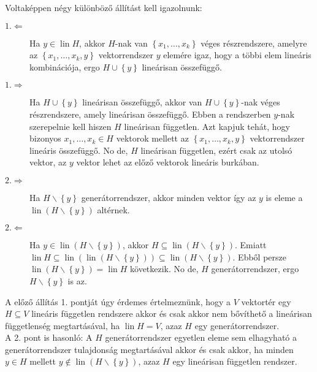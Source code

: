 \documentclass[9pt, a4paper, showtrims]{memoir}
\makeatletter
\renewenvironment{proof}[1][\proofname]
    {\par\pushQED{\qed}%
    \normalfont \topsep6\p@\@plus6\p@\relax
    \trivlist
    \item[\hskip\labelsep
        \itshape
    #1\@addpunct{:}]\ignorespaces}
    {\popQED\endtrivlist\@endpefalse}
\theoremstyle{plain}
\theoremstyle{remark}
\theoremstyle{definition}
\DeclareMathOperator{\lin}{lin}
\makeatother
\begin{document}
\begin{proof}
    Voltaképpen négy különböző állítást kell igazolnunk:
    \begin{description}
        \item[$1.\Leftarrow$]
            Ha $y\in\lin H$, akkor $H$-nak van $\left\{ x_1,\ldots,x_k \right\}$ véges részrendszere,
            amelyre az $\left\{ x_1,\ldots,x_k,y \right\}$ vektorrendszer $y$ elemére igaz, hogy a többi elem lineáris kombinációja,
            ergo $H\cup\left\{ y \right\}$ lineárisan összefüggő.
        \item[$1.\Rightarrow$]
            Ha $H\cup\left\{ y \right\}$ lineárisan összefüggő, akkor van $H\cup\left\{ y \right\}$-nak véges részrendszere, amely lineárisan összefüggő.
            Ebben a rendszerben $y$-nak szerepelnie kell hiszen $H$ lineárisan független.
            Azt kapjuk tehát, hogy bizonyos $x_1,\ldots,x_k\in H$ vektorok mellett az $\left\{ x_1,\ldots,x_k,y \right\}$ vektorrendszer lineáris összefüggő.
            No de, $H$ lineárisan független, ezért csak az utolsó vektor, az $y$ vektor lehet az előző vektorok lineáris burkában.
        \item[$2.\Rightarrow$]
            Ha $H\smallsetminus\left\{ y \right\}$ generátorrendszer, akkor minden vektor így az $y$ is eleme a $\lin\left( H\smallsetminus\left\{ y \right\} \right)$ altérnek.
        \item[$2.\Leftarrow$]
            Ha $y\in\lin\left( H\smallsetminus\left\{ y \right\} \right)$, akkor $H\subseteq\lin\left( H\smallsetminus\left\{ y \right\} \right)$.
            Emiatt $\lin H\subseteq\lin\left( \lin\left( H\smallsetminus\left\{ y \right\} \right) \right)\subseteq\lin\left( H\smallsetminus\left\{ y \right\} \right)$.
            Ebből persze $\lin\left( H\smallsetminus\left\{ y \right\} \right)=\lin H$ következik.
            No de, $H$ generátorrendszer, ergo $H\smallsetminus\left\{ y \right\}$ is az.
            \qedhere
    \end{description}
\end{proof}
A előző állítás 1. pontját úgy érdemes értelmeznünk, hogy a $V$ vektortér egy $H\subseteq V$ lineáris független rendszere akkor és csak akkor nem bővíthető a lineárisan függetlenség megtartásával, ha $\lin H=V$, azaz $H$ egy generátorrendszer.
\\
A 2. pont is hasonló: A $H$ generátorrendszer egyetlen eleme sem elhagyható a generátorrendszer tulajdonság megtartásával akkor és csak akkor, ha minden $y\in H$ mellett $y\notin\lin\left( H\smallsetminus\left\{y \right\} \right)$, azaz $H$ egy lineárisan független rendszer.
\end{document}
